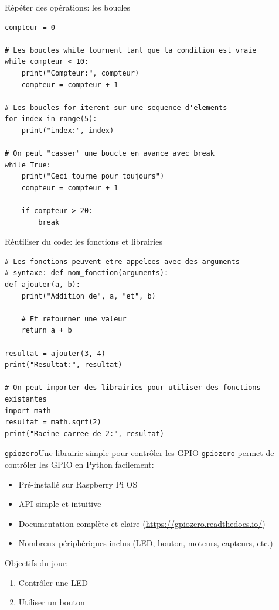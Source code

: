\documentclass[
aspectratio=169 %
]{beamer}
\begin{document}
\begin{frame}[fragile]{Répéter des opérations: les boucles}
    \begin{lstlisting}
compteur = 0

# Les boucles while tournent tant que la condition est vraie
while compteur < 10:
    print("Compteur:", compteur)
    compteur = compteur + 1  

# Les boucles for iterent sur une sequence d'elements
for index in range(5):
    print("index:", index)

# On peut "casser" une boucle en avance avec break
while True:
    print("Ceci tourne pour toujours")
    compteur = compteur + 1

    if compteur > 20:
        break
\end{lstlisting}
\end{frame}

\begin{frame}[fragile]{Réutiliser du code: les fonctions et librairies}
    \begin{lstlisting}
# Les fonctions peuvent etre appelees avec des arguments
# syntaxe: def nom_fonction(arguments):
def ajouter(a, b):
    print("Addition de", a, "et", b)

    # Et retourner une valeur
    return a + b

resultat = ajouter(3, 4)
print("Resultat:", resultat)

# On peut importer des librairies pour utiliser des fonctions existantes
import math
resultat = math.sqrt(2)
print("Racine carree de 2:", resultat)
\end{lstlisting}
\end{frame}

\begin{frame}{\texttt{gpiozero}}{Une librairie simple pour contrôler les GPIO}
    \texttt{gpiozero} permet de contrôler les GPIO en Python facilement:
    \begin{itemize}
        \item Pré-installé sur Raspberry Pi OS
        \item API simple et intuitive
        \item Documentation complète et claire
              (\url{https://gpiozero.readthedocs.io/})
        \item Nombreux périphériques inclus (LED, bouton, moteurs, capteurs,
              etc.)
    \end{itemize}

    \bigskip
    Objectifs du jour:
    \begin{enumerate}
        \item Contrôler une LED
        \item Utiliser un bouton
    \end{enumerate}
\end{frame}
\end{document}
